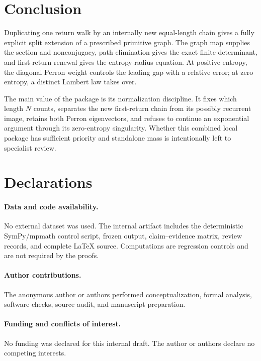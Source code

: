 \section{Conclusion}
\label{sec:conclusion}

Duplicating one return walk by an internally new equal-length chain gives a
fully explicit split extension of a prescribed primitive graph.  The graph
map supplies the section and nonconjugacy, path elimination gives the exact
finite determinant, and first-return renewal gives the entropy-radius
equation.  At positive entropy, the diagonal Perron weight controls the
leading gap with a relative error; at zero entropy, a distinct Lambert law
takes over.

The main value of the package is its normalization discipline.  It fixes
which length $N$ counts, separates the new first-return chain from its
possibly recurrent image, retains both Perron eigenvectors, and refuses to
continue an exponential argument through its zero-entropy singularity.
Whether this combined local package has sufficient priority and standalone
mass is intentionally left to specialist review.

\section*{Declarations}

\paragraph{Data and code availability.}
No external dataset was used.  The internal artifact includes the
deterministic SymPy/mpmath control script, frozen output, claim--evidence
matrix, review records, and complete \LaTeX{} source.  Computations are
regression controls and are not required by the proofs.

\paragraph{Author contributions.}
The anonymous author or authors performed conceptualization, formal analysis,
software checks, source audit, and manuscript preparation.

\paragraph{Funding and conflicts of interest.}
No funding was declared for this internal draft.  The author or authors
declare no competing interests.

